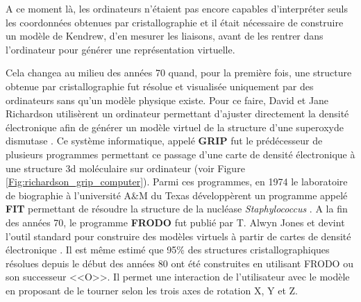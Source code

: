 A ce moment là, les ordinateurs n'étaient pas encore capables d'interpréter seuls les coordonnées obtenues par cristallographie et il était nécessaire de construire un modèle de Kendrew, d'en mesurer les liaisons, avant de les rentrer dans l'ordinateur pour générer une représentation virtuelle.

Cela changea au milieu des années 70 quand, pour la première fois, une structure obtenue par cristallographie fut résolue et visualisée uniquement par des ordinateurs sans qu'un modèle physique existe. Pour ce faire, David et Jane Richardson utilisèrent un ordinateur permettant d'ajuster directement la densité électronique afin de générer un modèle virtuel de la structure d'une superoxyde dismutase \cite{tainer1982determination}. Ce système informatique, appelé \textbf{GRIP} fut le prédécesseur de plusieurs programmes permettant ce passage d'une carte de densité électronique à une structure 3d moléculaire sur ordinateur (voir Figure \ref{Fig:richardson_grip_computer}). Parmi ces programmes, en 1974 le laboratoire de biographie à l'université A\&M du Texas développèrent un programme appelé \textbf{FIT} permettant de résoudre la structure de la nucléase \textit{Staphylococcus} \cite{collins1975protein}. A la fin des années 70, le programme \textbf{FRODO} fut publié par T. Alwyn Jones et devint l'outil standard pour construire des modèles virtuels à partir de cartes de densité électronique \cite{jones1978graphics}. Il est même estimé que 95\% des structures cristallographiques résolues depuis le début des années 80 ont été construites en utilisant FRODO ou son successeur <<O>>. Il permet une interaction de l'utilisateur avec le modèle en proposant de le tourner selon les trois axes de rotation X, Y et Z.

